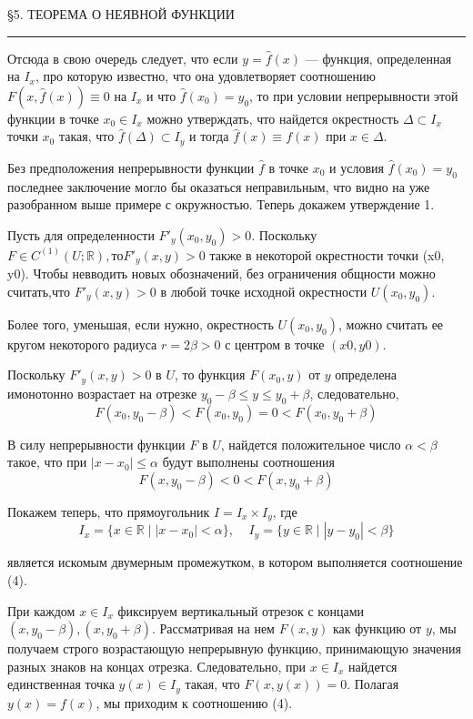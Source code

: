 \documentclass[a4paper, 12pt]{book}
\begin{document}
    \begin{center}
        \begin{spacing}
            \S5. ТЕОРЕМА О НЕЯВНОЙ ФУНКЦИИ 
            \noindent\rule{\textwidth}{1pt}
	\end{spacing}
    \end{center}
    \par Отсюда в свою очередь следует, что если $y = \hat{f}(x)$ — функция, определенная на $I_x$, про которую известно, что она удовлетворяет соотношению $F(x, \hat{f}(x)) \equiv 0$ на $I_x$ и что $\hat{f}(x_0) = y_0$, то при условии непрерывности этой функции в точке $x_0 \in I_x$ можно утверждать, что найдется окрестность $\Delta \subset I_x$ точки $x_0$ такая, что $\hat{f}(\Delta) \subset I_y$ и тогда $\hat{f}(x) \equiv f(x)$ при $x \in \Delta$.
    \par Без предположения непрерывности функции $\hat{f}$ в точке $x_0$ и условия $\hat{f}(x_0) = y_0$ последнее заключение могло бы оказаться неправильным, что видно на уже разобранном выше примере с окружностью. Теперь докажем утверждение 1.
    \par \blacktriangleleft Пусть для определенности $F′_y(x_0, y_0)>0$. Поскольку $F \in C^{(1)}(U; \mathbb{R}),то F′_y(x, y) > 0$ также в некоторой окрестности точки (x0, y0). Чтобы невводить новых обозначений, без ограничения общности можно считать,что $F′_y(x, y) > 0$ в любой точке исходной окрестности $U(x_0, y_0)$.
    \par Более того, уменьшая, если нужно, окрестность $U(x_0, y_0)$, можно
считать ее кругом некоторого радиуса $r = 2\beta > 0$ с центром в точке $(x0, y0)$.
    \par Поскольку $F′_y(x, y) > 0$ в $U$, то функция $F(x_0, y)$ от $y$ определена имонотонно возрастает на отрезке $y_0-\beta \leq y \leq y_0 + \beta$, следовательно,
    $$F(x_0, y_0 - \beta) < F(x_0, y_0) = 0 < F(x_0, y_0 + \beta)$$
    \par В силу непрерывности функции $F$ в $U$, найдется положительное число $\alpha < \beta$ такое, что при $|x − x_0| \leq \alpha$ будут выполнены соотношения
    $$F(x, y_0 - \beta) < 0 < F(x, y_0 + \beta)$$
    \par Покажем теперь, что прямоугольник $I = I_x × I_y$, где
    $$I_x = \{ x \in \mathbb{R} \mid |x - x_0| < \alpha \}, \;\;\;\; I_y = \{ y \in \mathbb{R} \mid |y - y_0| < \beta \}$$
    \par является искомым двумерным промежутком, в котором выполняется соотношение (4).
    \par При каждом $x \in I_x$ фиксируем вертикальный отрезок с концами $(x, y_0 − \beta), (x, y_0 + \beta)$. Рассматривая на нем $F(x, y)$ как функцию от $y$, мы получаем строго возрастающую непрерывную функцию, принимающую значения разных знаков на концах отрезка. Следовательно, при $x \in I_x$ найдется единственная точка $y(x) \in I_y$ такая, что $F(x, y(x)) = 0$. Полагая $y(x) = f(x)$, мы приходим к соотношению (4).
\end{document}
